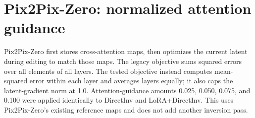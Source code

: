 \documentclass[10pt]{article}
\begin{document}
\section*{Pix2Pix-Zero: normalized attention guidance}

Pix2Pix-Zero first stores cross-attention maps, then optimizes the current
latent during editing to match those maps. The legacy objective sums squared
errors over all elements of all layers. The tested objective instead computes
mean-squared error within each layer and averages layers equally; it also caps
the latent-gradient norm at 1.0. Attention-guidance amounts 0.025, 0.050, 0.075,
and 0.100 were applied identically to DirectInv and LoRA+DirectInv. This uses
Pix2Pix-Zero's existing reference maps and does not add another inversion pass.

\begin{table}[htbp]
  \centering
  \scriptsize
  \setlength{\tabcolsep}{2.5pt}
  \caption{Pix2Pix-Zero with equal per-layer attention-loss weighting and a
  latent-gradient norm cap of 1.0. The guidance column is the Pix2Pix-Zero
  attention-guidance amount, not diffusion CFG.}
  \label{tab:pix2pix-normalized}
\end{table}
\end{document}

